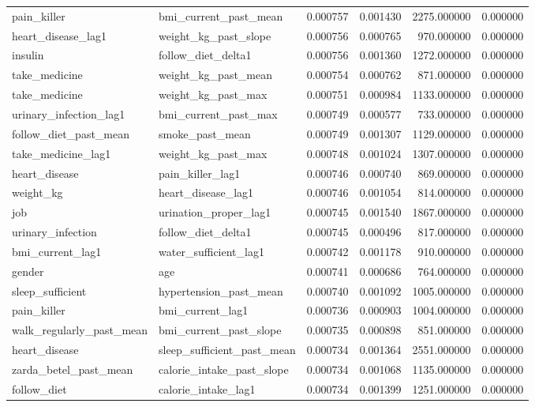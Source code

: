 \begin{longtable}{llrrrr}
pain\_killer & bmi\_current\_past\_mean & 0.000757 & 0.001430 & 2275.000000 & 0.000000 \\
heart\_disease\_lag1 & weight\_kg\_past\_slope & 0.000756 & 0.000765 & 970.000000 & 0.000000 \\
insulin & follow\_diet\_delta1 & 0.000756 & 0.001360 & 1272.000000 & 0.000000 \\
take\_medicine & weight\_kg\_past\_mean & 0.000754 & 0.000762 & 871.000000 & 0.000000 \\
take\_medicine & weight\_kg\_past\_max & 0.000751 & 0.000984 & 1133.000000 & 0.000000 \\
urinary\_infection\_lag1 & bmi\_current\_past\_max & 0.000749 & 0.000577 & 733.000000 & 0.000000 \\
follow\_diet\_past\_mean & smoke\_past\_mean & 0.000749 & 0.001307 & 1129.000000 & 0.000000 \\
take\_medicine\_lag1 & weight\_kg\_past\_max & 0.000748 & 0.001024 & 1307.000000 & 0.000000 \\
heart\_disease & pain\_killer\_lag1 & 0.000746 & 0.000740 & 869.000000 & 0.000000 \\
weight\_kg & heart\_disease\_lag1 & 0.000746 & 0.001054 & 814.000000 & 0.000000 \\
job & urination\_proper\_lag1 & 0.000745 & 0.001540 & 1867.000000 & 0.000000 \\
urinary\_infection & follow\_diet\_delta1 & 0.000745 & 0.000496 & 817.000000 & 0.000000 \\
bmi\_current\_lag1 & water\_sufficient\_lag1 & 0.000742 & 0.001178 & 910.000000 & 0.000000 \\
gender & age & 0.000741 & 0.000686 & 764.000000 & 0.000000 \\
sleep\_sufficient & hypertension\_past\_mean & 0.000740 & 0.001092 & 1005.000000 & 0.000000 \\
pain\_killer & bmi\_current\_lag1 & 0.000736 & 0.000903 & 1004.000000 & 0.000000 \\
walk\_regularly\_past\_mean & bmi\_current\_past\_slope & 0.000735 & 0.000898 & 851.000000 & 0.000000 \\
heart\_disease & sleep\_sufficient\_past\_mean & 0.000734 & 0.001364 & 2551.000000 & 0.000000 \\
zarda\_betel\_past\_mean & calorie\_intake\_past\_slope & 0.000734 & 0.001068 & 1135.000000 & 0.000000 \\
follow\_diet & calorie\_intake\_lag1 & 0.000734 & 0.001399 & 1251.000000 & 0.000000 \\

\end{longtable}
